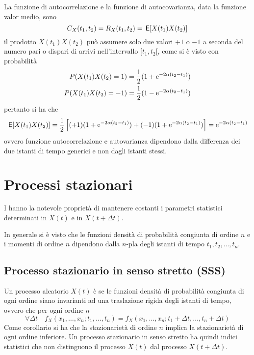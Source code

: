 La funzione di autocorrelazione e la funzione di autocovarianza, data la funzione valor medio, sono \[C_X(t_1,t_2)=R_X(t_1,t_2)=\,{\operatorname{\mathsf{E}}}\!\left[{X(t_1)X(t_2)}\right]\]
il prodotto $X(t_1)X(t_2)$ può assumere solo due valori $+1$ o $-1$ a seconda del numero pari o dispari di arrivi nell'intervallo $[t_1,t_2[$, come si è visto con probabilità
\[\begin{split}P(X(t_1)X(t_2)=1)&=\frac{1}{2}(1+\operatorname{e}^{-2\alpha(t_2-t_1)})\\
P(X(t_1)X(t_2)=-1)&=\frac{1}{2}(1-\operatorname{e}^{-2\alpha(t_2-t_1)})\end{split}\]
pertanto si ha che
\begin{equation}\begin{split}\,{\operatorname{\mathsf{E}}}\!\left[{X(t_1)X(t_2)}\right]=\frac{1}{2}\left[(+1)(1+\operatorname{e}^{-2\alpha(t_2-t_1)})+(-1)(1+\operatorname{e}^{-2\alpha(t_2-t_1)})\right]=\operatorname{e}^{-2\alpha(t_2-t_1)}\end{split}\end{equation}
ovvero funzione autocorrelazione e autovarianza dipendono dalla differenza dei due istanti di tempo generici e non dagli istanti stessi.

\section{Processi stazionari}
I  hanno la notevole proprietà di mantenere costanti i parametri statistici determinati in $X(t)$ e in $X(t+\Delta t)$. 

In generale si è visto che le funzioni densità di probabilità congiunta di ordine $n$ e i momenti di ordine $n$ dipendono dalla $n$-pla degli istanti di tempo $t_1,t_2,\dots,t_n$.

\subsection{Processo stazionario in senso stretto (SSS)}
Un processo aleatorio $X(t)$ è  se le funzioni densità di probabilità congiunta di ogni ordine siano invarianti ad una traslazione rigida degli istanti di tempo, ovvero che per ogni ordine $n$
\begin{equation}
\forall\Delta t\quad f_X(x_1,\dots,x_n;t_1,\dots,t_n)=f_X(x_1,\dots,x_n;t_1+\Delta t,\dots,t_n+\Delta t)
\end{equation}
Come corollario si ha che la stazionarietà di ordine $n$ implica la stazionarietà di ogni ordine inferiore.
Un processo stazionario in senso stretto ha quindi indici statistici che non distinguono il processo $X(t)$ dal processo $X(t+\Delta t)$.

